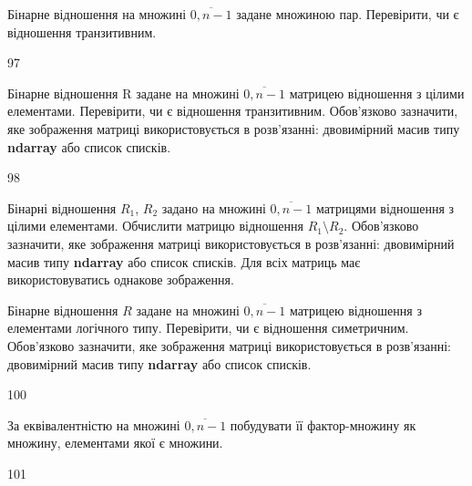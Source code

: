 Бінарне відношення на множині $\overline{0,n-1}$ задане множиною пар. Перевірити, чи є відношення транзитивним.
\\\par
97 














Бінарне відношення R задане на множині $\overline{0,n-1}$ матрицею відношення з цілими елементами.  Перевірити, чи є відношення транзитивним. Обов'язково зазначити, яке зображення матриці використовується в розв'язанні: двовимірний масив типу \textbf{ndarray} або список списків.
\\\par
98 














Бінарні відношення $R_1$, $R_2$ задано на множині $\overline{0,n-1}$ матрицями відношення з цілими елементами. Обчислити матрицю відношення $R_1\setminus R_2$. Обов'язково зазначити, яке зображення матриці використовується в розв'язанні: двовимірний масив типу \textbf{ndarray} або список списків. Для всіх матриць має використовуватись однакове зображення.
\\\par
{} 














Бінарне відношення $R$ задане на множині $\overline{0,n-1}$ матрицею відношення з елементами логічного типу. Перевірити, чи є відношення симетричним. Обов'язково зазначити, яке зображення матриці використовується в розв'язанні: двовимірний масив типу \textbf{ndarray} або список списків.
\\\par
100 














За еквівалентністю на множині $\overline{0,n-1}$ побудувати її фактор-множину як множину, елементами якої є множини.
\\\par
101 















